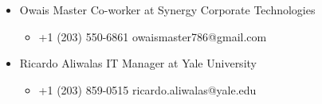 \documentclass[letterpaper]{article}
\providecommand{\tightlist}{%
  \setlength{\itemsep}{0pt}\setlength{\parskip}{0pt}}
\begin{document}
\begin{itemize}
\tightlist
\item
  Owais Master \textbar{} Co-worker at Synergy Corporate Technologies

  \begin{itemize}
  \tightlist
  \item
    +1 (203) 550-6861 \textbar{} owaismaster786@gmail.com
  \end{itemize}
\item
  Ricardo Aliwalas \textbar{} IT Manager at Yale University

  \begin{itemize}
  \tightlist
  \item
    +1 (203) 859-0515 \textbar{} ricardo.aliwalas@yale.edu
  \end{itemize}
\end{itemize}
\end{document}
